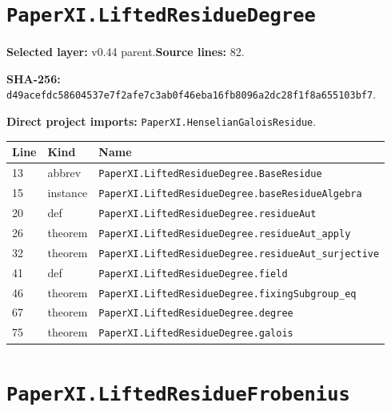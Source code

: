 \documentclass[10pt,oneside]{book}
\begin{document}
\section{\texorpdfstring{\nolinkurl{PaperXI.LiftedResidueDegree}}{PaperXI.LiftedResidueDegree}}\label{module:PaperXI.LiftedResidueDegree}

\textbf{Selected layer:} v0.44 parent.\quad\textbf{Source lines:} 82.\par\textbf{SHA-256:} {\scriptsize\nolinkurl{d49acefdc58604537e7f2afe7c3ab0f46eba16fb8096a2dc28f1f8a655103bf7}}.


\textbf{Direct project imports:} \nolinkurl{PaperXI.HenselianGaloisResidue}.

\begin{longtable}{@{}p{}p{}p{}@{}}\toprule Line&Kind&Name\\\midrule\endhead

13&abbrev&\nolinkurl{PaperXI.LiftedResidueDegree.BaseResidue}\\

15&instance&\nolinkurl{PaperXI.LiftedResidueDegree.baseResidueAlgebra}\\

20&def&\nolinkurl{PaperXI.LiftedResidueDegree.residueAut}\\

26&theorem&\nolinkurl{PaperXI.LiftedResidueDegree.residueAut_apply}\\

32&theorem&\nolinkurl{PaperXI.LiftedResidueDegree.residueAut_surjective}\\

41&def&\nolinkurl{PaperXI.LiftedResidueDegree.field}\\

46&theorem&\nolinkurl{PaperXI.LiftedResidueDegree.fixingSubgroup_eq}\\

67&theorem&\nolinkurl{PaperXI.LiftedResidueDegree.degree}\\

75&theorem&\nolinkurl{PaperXI.LiftedResidueDegree.galois}\\

\bottomrule\end{longtable}

\section{\texorpdfstring{\nolinkurl{PaperXI.LiftedResidueFrobenius}}{PaperXI.LiftedResidueFrobenius}}\label{module:PaperXI.LiftedResidueFrobenius}
\end{document}
